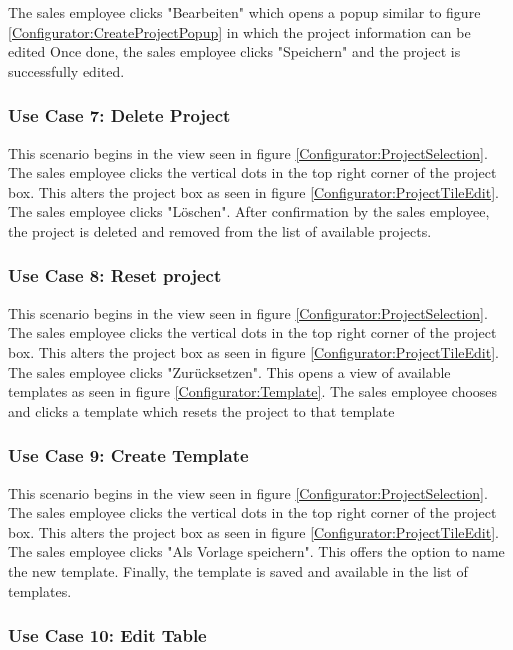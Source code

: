 The sales employee clicks "Bearbeiten" which opens a popup similar to figure \ref{Configurator:CreateProjectPopup} in which the project information can be edited Once done, the sales employee clicks "Speichern" and the project is successfully edited.


\subsubsection{Use Case 7: Delete Project}

This scenario begins in the view seen in figure \ref{Configurator:ProjectSelection}. The sales employee clicks the vertical dots in the top right corner of the project box. This alters the project box as seen in figure \ref{Configurator:ProjectTileEdit}. The sales employee clicks "Löschen". After confirmation by the sales employee, the project is deleted and removed from the list of available projects.


\subsubsection{Use Case 8: Reset project}

This scenario begins in the view seen in figure \ref{Configurator:ProjectSelection}. The sales employee clicks the vertical dots in the top right corner of the project box. This alters the project box as seen in figure \ref{Configurator:ProjectTileEdit}. The sales employee clicks "Zurücksetzen". This opens a view of available templates as seen in figure \ref{Configurator:Template}. The sales employee chooses and clicks a template which resets the project to that template


\subsubsection{Use Case 9: Create Template}

This scenario begins in the view seen in figure \ref{Configurator:ProjectSelection}. The sales employee clicks the vertical dots in the top right corner of the project box. This alters the project box as seen in figure \ref{Configurator:ProjectTileEdit}. The sales employee clicks "Als Vorlage speichern". This offers the option to name the new template. Finally, the template is saved and available in the list of templates.


\subsubsection{Use Case 10: Edit Table}

